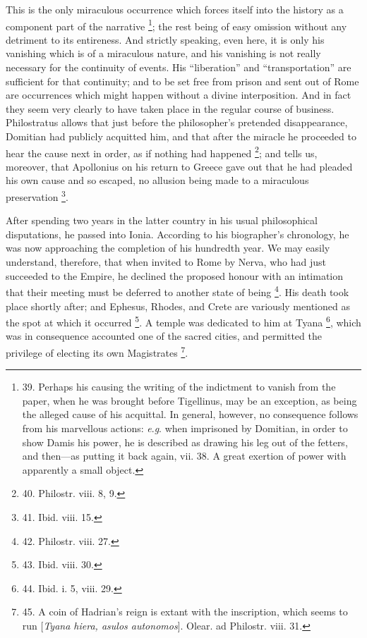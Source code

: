 This is the only miraculous
occurrence which forces itself into the history as a component part of
the narrative \footnote{39.
Perhaps his causing the writing of the indictment to vanish from the
paper, when he was brought before Tigellinus, may be an exception, as
being the alleged cause of his acquittal. In general, however, no
consequence follows from his marvellous actions: \emph{e}.\emph{g}.
when imprisoned by Domitian, in order to show Damis his power, he is
described as drawing his leg out of the fetters, and then—as putting
it back again, vii. 38. A great exertion of power with apparently a
small object.}; the
rest being of easy omission without any detriment to its entireness.
And strictly speaking, even here, it is only his vanishing which is of
a miraculous nature, and his vanishing is not really necessary for the
continuity of events. His ``liberation'' and ``transportation'' are
sufficient for that continuity; and to be set free from prison and
sent out of Rome are occurrences which might happen without a divine
interposition. And in fact they seem very clearly to have taken place
in the regular course of business. Philostratus allows that just
before the philosopher's pretended disappearance, Domitian had
publicly acquitted him, and that after the miracle he proceeded to
hear the cause next in order, as if nothing had happened \footnote{40.
Philostr. viii. 8, 9.}; and tells us, moreover, that Apollonius on his return to
Greece gave out that he had pleaded his own cause and so escaped, no
allusion being made to a miraculous preservation \footnote{41.
Ibid. viii. 15.}.

After spending two years in
the latter country in his usual philosophical disputations, he passed
into Ionia. According to his biographer's chronology, he was now
approaching the completion of his hundredth year. We may easily
understand, therefore, that when invited to Rome by Nerva, who had just succeeded to the Empire, he declined the
proposed honour with an intimation that their meeting must be deferred
to another state of being \footnote{42.
Philostr. viii. 27.}.
His death took place shortly after; and Ephesus, Rhodes, and Crete are
variously mentioned as the spot at which it occurred \footnote{43.
Ibid. viii. 30.}. A temple was dedicated to him at Tyana \footnote{44.
Ibid. i. 5, viii. 29.}, which was in consequence accounted one of the sacred cities,
and permitted the privilege of electing its own Magistrates \footnote{45.
A coin of Hadrian's reign is extant with the inscription, which seems
to run [\emph{Tyana hiera, asulos autonomos}]. Olear. ad Philostr.
viii. 31.}.

